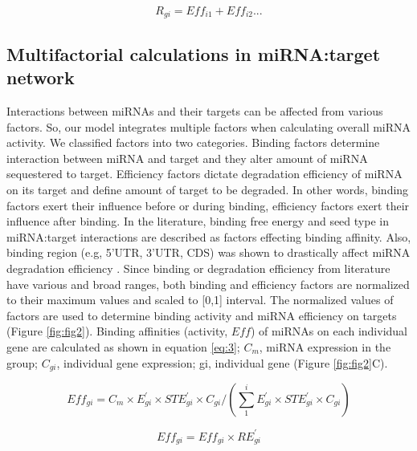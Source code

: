 \documentclass[a4,center,fleqn]{NAR}
\begin{document}
\begin{equation*}
   R_{gi}= Eff_{i1} + Eff_{i2} ... \tag{2}\label{eq:2}
\end{equation*}

\subsection{Multifactorial calculations in miRNA:target network}

Interactions between miRNAs and their targets can be affected from
various factors. So, our model integrates multiple factors when
calculating overall miRNA activity. We classified factors into two
categories. Binding factors determine interaction between miRNA and
target and they alter amount of miRNA sequestered to target. Efficiency
factors dictate degradation efficiency of miRNA on its target and define
amount of target to be degraded. In other words, binding factors exert
their influence before or during binding, efficiency factors exert their
influence after binding. In the literature, binding free energy
\citep{cao_predicting_2012, helwak_mapping_2013} and seed type
\citep{werfel_preferential_2017} in miRNA:target interactions are
described as factors effecting binding affinity. Also, binding region
(e.g, 5'UTR, 3'UTR, CDS) was shown to drastically affect miRNA
degradation efficiency
\citep{hausser_analysis_2013, helwak_mapping_2013}. Since binding or
degradation efficiency from literature have various and broad ranges,
both binding and efficiency factors are normalized to their maximum
values and scaled to {[}0,1{]} interval. The normalized values of
factors are used to determine binding activity and miRNA efficiency on
targets (Figure \ref{fig:fig2}). Binding affinities (activity, \(Eff\))
of miRNAs on each individual gene are calculated as shown in equation
\eqref{eq:3}; \(C_m\), miRNA expression in the group; \(C_{gi}\),
individual gene expression; gi, individual gene (Figure
\ref{fig:fig2}C).

\begin{equation}
Eff_{gi}= C_m \times E^\prime_{gi} \times STE^\prime_{gi} \times C_{gi}/(\sum_{1}^{i} E^\prime_{gi} \times STE^\prime_{gi} \times C_{gi}) \tag{3}\label{eq:3}
\end{equation}

\begin{equation}
Eff_{gi}= Eff_{gi}\times RE^\prime_{gi} \tag{4}\label{eq:4}
\end{equation}
\end{document}

